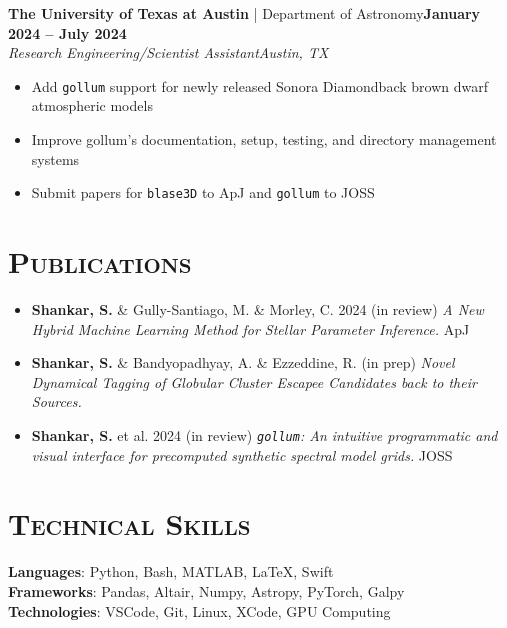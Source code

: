 \documentclass[11pt]{article}
\begin{document}
\normalsize\textbf{The University of Texas at Austin} | Department of Astronomy\hfill\small\textbf{January 2024 -- July 2024}
\\ \textit{Research Engineering/Scientist Assistant\hfill Austin, TX} \vspace{-15pt}
\\ \begin{itemize}[itemsep=-3pt, parsep=3pt, label={--}]
    \item Add \texttt{gollum} support for newly released Sonora Diamondback brown dwarf atmospheric models
    \item Improve gollum's documentation, setup, testing, and directory management systems
    \item Submit papers for \texttt{blase3D} to ApJ and \texttt{gollum} to JOSS
\end{itemize}

\section{\textsc{Publications}}
\begin{itemize}[itemsep=-3pt, parsep=3pt, label={--}]
    \item \textbf{Shankar, S.} \& Gully-Santiago, M. \& Morley, C. 2024 (in review)
    \textit{A New Hybrid Machine Learning Method for Stellar Parameter Inference.} ApJ
    \item \textbf{Shankar, S.} \& Bandyopadhyay, A. \& Ezzeddine, R. (in prep)
    \textit{Novel Dynamical Tagging of Globular Cluster Escapee Candidates back to their Sources.}
    \item \textbf{Shankar, S.} et al. 2024 (in review)
    \textit{\texttt{gollum}: An intuitive programmatic and visual interface for precomputed synthetic spectral model grids.} JOSS
\end{itemize}

\section{\textsc{Technical Skills}}
\textbf{Languages}: Python, Bash, MATLAB, \LaTeX, Swift
\\\textbf{Frameworks}: Pandas, Altair, Numpy, Astropy, PyTorch, Galpy
\\\textbf{Technologies}: VSCode, Git, Linux, XCode, GPU Computing
\end{document}
